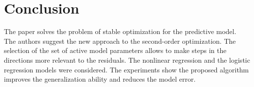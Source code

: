 \documentclass[a4paper,12pt]{article}
\theoremstyle{plain} %
\theoremstyle{definition} %
\theoremstyle{remark} %
\begin{document}
\section*{Conclusion}
The paper solves the problem of stable optimization for the predictive model.
The authors suggest the new approach to the second-order optimization. 
The selection of the set of active model parameters allows to make steps in the directions more relevant to the residuals.
The nonlinear regression and the logistic regression models were considered.
The experiments show the proposed algorithm improves the generalization ability and reduces the model error.

  
  
	
\end{document}
